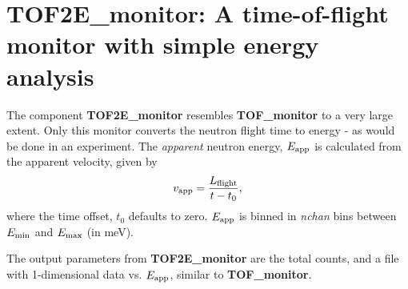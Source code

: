 \section{TOF2E\_monitor: A time-of-flight monitor with simple energy analysis} \label{s:TOF2E_monitor}
The component {\bf TOF2E\_monitor} resembles {\bf TOF\_monitor}
to a very large extent. Only this monitor converts the neutron flight
time to energy - as would be done in an experiment.
The {\em apparent} neutron energy, $E_{\rm app}$ is calculated 
from the apparent velocity, given by 
\begin{equation}
v_{\rm app} = \frac{L_{\rm flight}}{t-t_0} ,
\end{equation}
where the time offset, $t_0$ defaults to zero.
$E_{\rm app}$ is binned in \textit{nchan} bins between
$E_{\rm min}$ and $E_{\rm max}$ (in meV).

The output parameters from {\bf TOF2E\_monitor} are the total counts,
and a file with 1-dimensional data vs. $E_{\rm app}$, 
similar to {\bf TOF\_monitor}.

